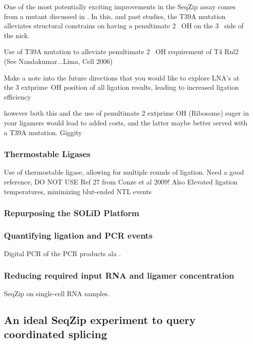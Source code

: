     One of the most potentially exciting improvements in the SeqZip assay comes from a mutant discussed in \citet{Nandakumar2006}. In this, and past studies, the T39A mutation alleviates structural constrains on having a penultimate 2\textprime~ OH on the 3\textprime~ side of the nick. 

    Use of T39A mutation to alleviate penultimate 2\textprime~ OH requirement of T4 Rnl2 (See Nandakumar...Lima, Cell 2006)

    Make a note into the future directions that you would like to explore LNA’s at the 3  extprime~OH position of all ligation results, leading to increased ligation efficiency

    however both this and the use of penultimate 2  extprime OH (Ribosome) suger in your ligamers would lead to added costs, and the latter maybe better served with a T39A mutation. Giggity

    \subsubsection{Thermostable Ligases}

    Use of thermostable ligase, allowing for multiple rounds of ligation. Need a good reference, DO NOT USE Ref 27 from Conze et al 2009! Also Elevated ligation temperatures, minimizing blut-ended NTL events

    \subsubsection{Repurposing the SOLiD Platform}

    \subsubsection{Quantifying ligation and PCR events}
    Digital PCR of the PCR products ala \citep{Shiroguchi2012a}. 

    \subsubsection{Reducing required input RNA and ligamer concentration}

    SeqZip on single-cell RNA samples.

  \subsection{An ideal SeqZip experiment to query coordinated splicing} \label{subsec: Ideal multiplex study}

